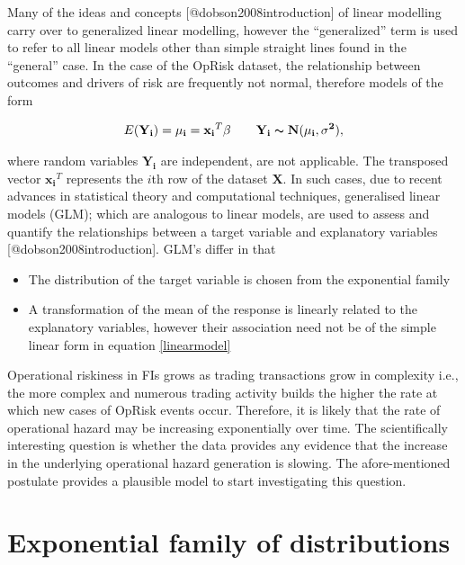 \documentclass[]{article}
\begin{document}
Many of the ideas and concepts {[}@dobson2008introduction{]} of linear
modelling carry over to generalized linear modelling, however the
``generalized'' term is used to refer to all linear models other than
simple straight lines found in the ``general'' case. In the case of the
OpRisk dataset, the relationship between outcomes and drivers of risk
are frequently not normal, therefore models of the form

\singlespacing

\begin{eqnarray}\label{linearmodel}
E(\mathbf{Y_i}) = \mathbf{\mu_i} = \mathbf{x_i}^T\mathbf{\beta} \qquad \mathbf{Y_i} \thicksim \mathbf{N(\mu_i, \sigma^2)},
\end{eqnarray} \doublespacing

where random variables \(\mathbf{Y_i}\) are independent, are not
applicable. The transposed vector \(\mathbf{x_i}^T\) represents the
\(i\)th row of the dataset \(\mathbf{X}\). In such cases, due to recent
advances in statistical theory and computational techniques, generalised
linear models (GLM); which are analogous to linear models, are used to
assess and quantify the relationships between a target variable and
explanatory variables {[}@dobson2008introduction{]}. GLM's differ in
that

\begin{itemize}
\item The distribution of the target variable is chosen from the exponential family
\item A transformation of the mean of the response is linearly related to the explanatory variables, however their association need not be of the simple linear form in equation \ref{linearmodel}
\end{itemize}
\medskip

Operational riskiness in FIs grows as trading transactions grow in
complexity i.e., the more complex and numerous trading activity builds
the higher the rate at which new cases of OpRisk events occur.
Therefore, it is likely that the rate of operational hazard may be
increasing exponentially over time. The scientifically interesting
question is whether the data provides any evidence that the increase in
the underlying operational hazard generation is slowing. The
afore-mentioned postulate provides a plausible model to start
investigating this question.\medskip

\section{Exponential family of distributions}
\label{sec: Exponential family of distributions}
\end{document}
